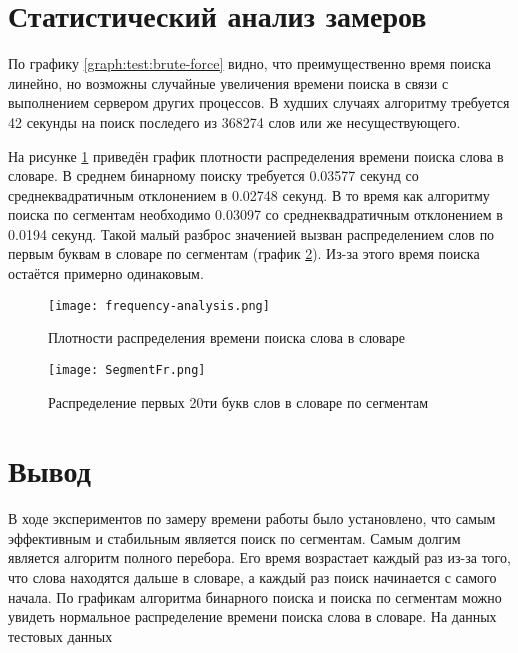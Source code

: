     \section{Статистический анализ замеров}
        По графику \ref{graph:test:brute-force} видно, 
        что преимущественно время поиска линейно, 
        но возможны случайные увеличения времени поиска 
        в связи с выполнением сервером других процессов.
        В худших случаях алгоритму требуется 42 секунды 
        на поиск последего из 368274 слов или же несуществующего. 

        На рисунке \ref{graph:analysis:frequency} приведён график
        плотности распределения времени поиска слова в словаре.
        В среднем бинарному поиску требуется 0.03577 секунд со 
        среднеквадратичным отклонением в 0.02748 секунд.
        В то время как алгоритму поиска по сегментам
        необходимо 0.03097 со среднеквадратичным отклонением в 0.0194 секунд. 
        Такой малый разброс значенией вызван распределением слов по первым буквам
        в словаре по сегментам (график \ref{graph:analysis:frequency:segment}). 
        Из-за этого время поиска остаётся примерно одинаковым.

        \begin{figure}[h!]
            \centering
                \texttt{[image: frequency-analysis.png]}
                \caption{Плотности распределения времени поиска слова в словаре}
                \label{graph:analysis:frequency}
        \end{figure}

        \begin{figure}[h!]
            \centering
                \texttt{[image: SegmentFr.png]}
                \caption{Распределение первых 20ти букв слов в словаре по сегментам}
                \label{graph:analysis:frequency:segment}
        \end{figure}

    \section{Вывод}
        В ходе экспериментов по замеру времени работы было установлено, что 
        самым эффективным и стабильным является поиск по сегментам.
        Самым долгим является алгоритм полного перебора.
        Его время возрастает каждый раз из-за того, 
        что слова находятся дальше в словаре, 
        а каждый раз поиск начинается с самого начала. 
        По графикам алгоритма бинарного поиска и поиска по сегментам 
        можно увидеть нормальное распределение времени поиска слова в словаре.
        На данных тестовых данных 

\newpage